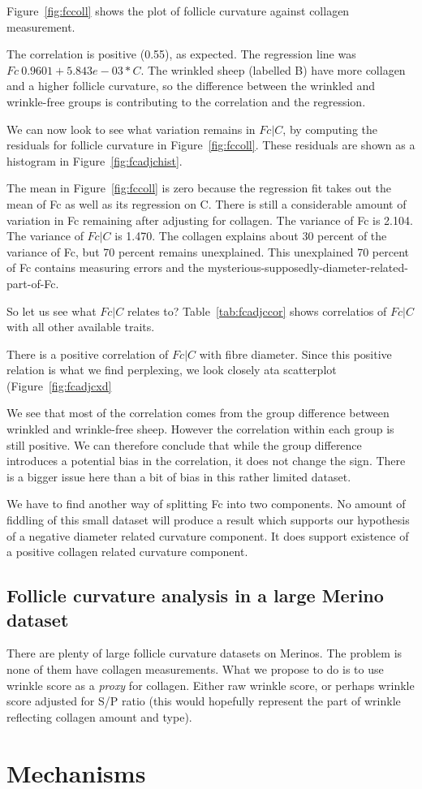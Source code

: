 \documentclass{article}
\begin{document}
Figure~\ref{fig:fccoll} shows the plot of follicle curvature against collagen measurement. 

The correlation is positive (0.55), as expected.  The regression line was $Fc ~ 0.9601 + 5.843e-03 * C $.   The wrinkled sheep (labelled B) have more collagen and a higher follicle curvature, so the difference between the wrinkled and wrinkle-free groups is contributing to the correlation and the regression.

We can now look to see what variation  remains in $Fc | C$, by computing the residuals for follicle curvature in Figure~\ref{fig:fccoll}. These residuals are shown as a histogram in Figure~\ref{fig:fcadjchist}. 


The mean in Figure~\ref{fig:fccoll} is zero because the regression fit takes out the mean of Fc as well as its regression on C. There is still a considerable amount of variation in Fc remaining after adjusting for collagen. The variance of Fc is 2.104. The variance of $Fc | C$ is 1.470. The collagen explains about 30 percent of the variance of Fc, but 70 percent remains unexplained. This unexplained 70 percent of Fc contains measuring errors and the mysterious-supposedly-diameter-related-part-of-Fc.

So let us see what $Fc | C$ relates to?  Table~\ref{tab:fcadjccor} shows correlatios of  $Fc | C$ with all other available traits.

There is a positive correlation of $Fc | C$ with fibre diameter. Since this positive relation is what we find perplexing, we look closely ata scatterplot (Figure~\ref{fig:fcadjcxd}

We see that most of the correlation comes from the group difference between wrinkled and wrinkle-free sheep. However the correlation within each group is still positive. We can therefore conclude that while the group difference introduces a potential bias in the correlation, it does not change the sign. There is a bigger issue here than a bit of bias in this rather limited dataset.

We have to find another way of splitting Fc into two components. No amount of fiddling of this small dataset will produce a result which supports our hypothesis of a negative diameter related curvature component. It does support existence of a positive collagen related curvature component. 


\subsection{ Follicle curvature analysis in a large Merino dataset}
 There are plenty of large follicle curvature datasets on Merinos. The problem is none of them have collagen measurements. What we propose to do is to use wrinkle score as a {\em proxy} for collagen. Either raw wrinkle score, or perhaps wrinkle score adjusted for S/P ratio (this would hopefully represent the part of wrinkle reflecting collagen amount and type).

\section{Mechanisms}




\end{document}

